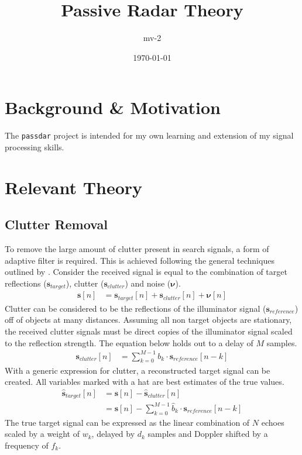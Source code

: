 \documentclass{article}
\title{Passive Radar Theory}
\author{mv-2}
\date{\today}
\begin{document}
\maketitle
\tableofcontents
\clearpage

\section{Background \& Motivation}
The \texttt{passdar} project is intended for my own learning and extension of my signal processing skills.

\section{Relevant Theory}
\subsection{Clutter Removal}
To remove the large amount of clutter present in search signals, a form of adaptive filter is required. This is achieved following the general techniques outlined by \textcite{ManningClutter}. Consider the received signal is equal to the combination of target reflections ($\bm{s}_{target}$), clutter ($\bm{s}_{clutter}$) and noise ($\bm{\nu}$).
\begin{align*}
  \bm{s}[n]&=\bm{s}_{target}[n]+\bm{s}_{clutter}[n]+\bm{\nu}[n]
\end{align*}
Clutter can be considered to be the reflections of the illuminator signal ($\bm{s}_{reference}$) off of objects at many distances. Assuming all non target objects are stationary, the received clutter signals must be direct copies of the illuminator signal scaled to the reflection strength. The equation below holds out to a delay of $M$ samples.
\begin{align*}
  \bm{s}_{clutter}[n]&=\sum_{k=0}^{M-1}b_k\cdot \bm{s}_{reference}[n-k]
\end{align*}
With a generic expression for clutter, a reconstructed target signal can be created. All variables marked with a hat are best estimates of the true values.
\begin{align*}
  \hat{\bm{s}}_{target}[n]&=\bm{s}[n]-\hat{\bm{s}}_{clutter}[n]\\
                          &=\bm{s}[n]-\sum_{k=0}^{M-1}\hat{b}_k\cdot \bm{s}_{reference}[n-k]
\end{align*}
The true target signal can be expressed as the linear combination of $N$ echoes scaled by a weight of $w_k$, delayed by $d_k$ samples and Doppler shifted by a frequency of $f_k$.
\end{document}
